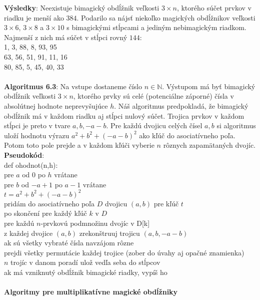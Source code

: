 \documentclass[12pt]{article}
\begin{document}
\textbf{Výsledky}: Neexistuje bimagický obdĺžnik veľkosti $3 \times n$, ktorého súčet prvkov v riadku je menší ako $384$. Podarilo sa nájsť niekoľko magických obdĺžnikov veľkosti $3 \times 6$, $3 \times 8$ a $3 \times 10$ s bimagickými stĺpcami a jediným nebimagickým riadkom. Najmenší z nich má súčet v stĺpci rovný $144$: \\
1, 3, 88, 8, 93, 95 \\
63, 56, 51, 91, 11, 16 \\
80, 85, 5, 45, 40, 33 \\\\

\textbf{Algoritmus 6.3}: Na vstupe dostaneme číslo $n \in \mathbb{N}$. Výstupom má byť bimagický obdĺžnik veľkosti $3 \times n$, ktorého prvky sú celé (potenciálne záporné) čísla v absolútnej hodnote neprevyšujúce $h$. Náš algoritmus predpokladá, že bimagický obdĺžnik má v každom riadku aj stĺpci nulový súčet. Trojica prvkov v každom stĺpci je preto v tvare $a, b, -a-b$. Pre každú dvojicu celých čísel $a,b$ si algoritmus uloží hodnotu výrazu $a^2 + b^2 + (-a-b)^2$ ako kľúč do asociatívneho poľa. Potom toto pole prejde a v každom kľúči vyberie $n$ rôznych zapamätaných dvojíc. \\

\textbf{Pseudokód}: \\
def ohodnot(n,h): \\
pre $a$ od $0$ po $h$ vrátane \\
pre $b$ od $-a+1$ po $a-1$ vrátane \\
$t = a^2 + b^2 + (-a-b)^2$ \\
pridám do asociatívneho poľa $D$ dvojicu $(a,b)$ pre kľúč $t$ \\
po skončení pre každý kľúč $k$ v $D$ \\
pre každú $n$-prvkovú podmnožinu dvojíc v D[k] \\
z každej dvojice $(a,b)$ zrekonštruuj trojicu $(a,b,-a-b)$ \\
ak sú všetky vybraté čísla navzájom rôzne \\
prejdi všetky permutácie každej trojice (zober do úvahy aj opačné znamienka) \\
$n$ trojíc v danom poradí ulož vedľa seba do stĺpcov \\
ak má vzniknutý obdĺžnik bimagické riadky, vypíš ho \\\\

\textbf{Algoritmy pre multiplikatívne magické obdĺžniky} \\
\end{document}
